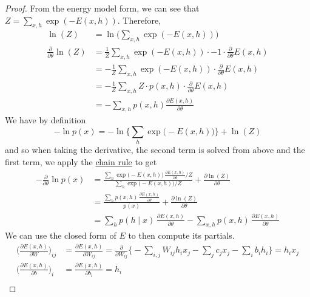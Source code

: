 \documentclass{article}
\begin{document}
    \begin{proof}
      From the energy model form, we can see that $Z = \sum_{x, h} \exp(-E(x, h))$. Therefore, 
      \begin{align}
        \ln(Z) & = \ln \bigg( \sum_{x, h} \exp(-E(x, h)) \bigg) \\ 
        \frac{\partial}{\partial \theta} \ln(Z) & = \frac{1}{Z} \sum_{x, h} \exp(-E(x, h)) \cdot -1 \cdot \frac{\partial}{\partial \theta} E(x, h) \\
               & = -\frac{1}{Z} \sum_{x, h} \exp(-E(x, h)) \cdot \frac{\partial}{\partial \theta} E(x, h) \\
               & = -\frac{1}{Z} \sum_{x, h} Z \cdot p(x, h) \cdot \frac{\partial}{\partial \theta} E(x, h) \\
               & = - \sum_{x, h} p(x, h) \frac{\partial E(x, h)}{\partial \theta}
      \end{align}
      We have by definition 
      \begin{equation} 
        -\ln p(x) = - \ln \bigg\{ \sum_{h} \exp \big( -E(x, h) \big) \bigg\} + \ln(Z)
      \end{equation}
      and so when taking the derivative, the second term is solved from above and the first term, we apply the \hyperref[mv-thm:chain-rule]{chain rule} to get 
      \begin{align} 
        -\frac{\partial}{\partial \theta} \ln p(x) & = \frac{\sum_{h} \exp \big( -E(x, h) \big) \, \frac{\partial E(x, h)}{\partial \theta} / Z}{\sum_{h} \exp \big( -E (x, h) \big) / Z} + \frac{\partial \ln(Z)}{\partial \theta} \\
                                                                         & = \frac{\sum_{h} p(x, h) \, \frac{\partial E(x, h)}{\partial \theta}}{p(x)} + \frac{\partial \ln(Z)}{\partial \theta} \\
                                                                         & = \sum_{h} p(h \mid x) \, \frac{\partial E(x, h)}{\partial \theta} - \sum_{x, h} p(x, h) \, \frac{\partial E(x, h)}{\partial \theta} 
      \end{align} 
      We can use the closed form of $E$ to then compute its partials. 
      \begin{align}
        \bigg( \frac{\partial E(x, h)}{\partial W} \bigg)_{ij} & = \frac{\partial E(x, h)}{\partial W_{ij}} = \frac{\partial}{\partial W_{ij}} \bigg\{ - \sum_{i,j} W_{ij} h_i x_j - \sum_j c_j x_j - \sum_i b_i h_i \bigg\} = h_i x_j \\
        \bigg( \frac{\partial E(x, h)}{\partial b} \bigg)_i & = \frac{\partial E(x, h)}{\partial b_i} = h_i  \\

\end{align}
\end{proof}
\end{document}
